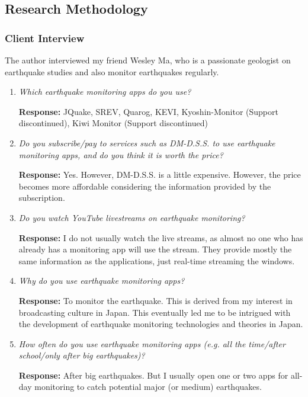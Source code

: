 \documentclass[10pt]{article}
\begin{document}
\subsection{Research Methodology}
\subsubsection{Client Interview}
The author interviewed my friend Wesley Ma, who is a passionate geologist on earthquake studies and also monitor earthquakes regularly.

\begin{enumerate}
    \item \textit{Which earthquake monitoring apps do you use?}

          \textbf{Response:} JQuake, SREV, Quarog, KEVI, Kyoshin-Monitor (Support discontinued), Kiwi Monitor (Support discontinued)

    \item \textit{Do you subscribe/pay to services such as DM-D.S.S. to use earthquake monitoring apps, and do you think it is worth the price?}

          \textbf{Response:} Yes. However, DM-D.S.S. is a little expensive. However, the price becomes more affordable considering the information provided by the subscription.

    \item \textit{Do you watch YouTube livestreams on earthquake monitoring?}

          \textbf{Response:} I do not usually watch the live streams, as almost no one who has already has a monitoring app will use the stream. They provide mostly the same information as the applications, just real-time streaming the windows.

    \item \textit{Why do you use earthquake monitoring apps?}

          \textbf{Response:} To monitor the earthquake. This is derived from my interest in broadcasting culture in Japan. This eventually led me to be intrigued with the development of earthquake monitoring technologies and theories in Japan.

    \item \textit{How often do you use earthquake monitoring apps (e.g. all the time/after school/only after big earthquakes)?}

          \textbf{Response:} After big earthquakes. But I usually open one or two apps for all-day monitoring to catch potential major (or medium) earthquakes.


\end{enumerate}
\end{document}
